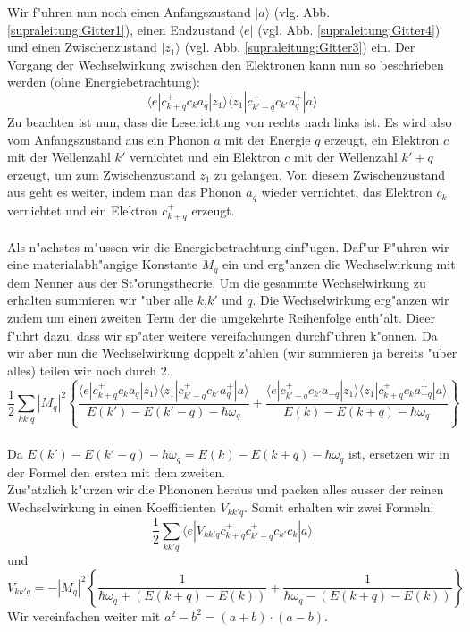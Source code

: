 \begin{refsection}
Wir f"uhren nun noch einen Anfangszustand $|a\rangle$ (vlg. Abb. \ref{supraleitung:Gitter1}), einen Endzustand $\langle e|$ (vgl. Abb. \ref{supraleitung:Gitter4}) und einen Zwischenzustand $|z_1\rangle$ (vgl. Abb. \ref{supraleitung:Gitter3}) ein. Der Vorgang der Wechselwirkung zwischen den Elektronen kann nun so beschrieben werden (ohne Energiebetrachtung):
\begin{equation}
\langle e|c^+_{k+q} c_k a_q |z_1\rangle\langle z_1| c^+_{k'-q} c_{k'} a^+_q |a\rangle
\label{supraleitung:WechelwirkungOE}
\end{equation}
Zu beachten ist nun, dass die Leserichtung von rechts nach links ist. Es wird also vom Anfangszustand aus ein Phonon $a$ mit der Energie $q$ erzeugt, ein Elektron $c$ mit der Wellenzahl $k'$ vernichtet und ein Elektron $c$ mit der Wellenzahl $k'+q$ erzeugt, um zum Zwischenzustand $z_1$ zu gelangen.
Von diesem Zwischenzustand aus geht es weiter, indem man das Phonon $a_q$ wieder vernichtet, das Elektron $c_k$ vernichtet und ein Elektron $c^+_{k+q}$ erzeugt.
\\
\\
Als n"achstes m"ussen wir die Energiebetrachtung einf"ugen. Daf"ur F"uhren wir eine materialabh"angige Konstante $M_q$ ein und erg"anzen die Wechselwirkung mit dem Nenner aus der St"orungstheorie.
Um die gesammte Wechselwirkung zu erhalten summieren wir "uber alle $k$,$k'$ und $q$. Die Wechselwirkung erg"anzen wir zudem um einen zweiten Term der die umgekehrte Reihenfolge enth"alt. Dieer f"uhrt dazu, dass wir sp"ater weitere vereifachungen durchf"uhren k"onnen. Da wir aber nun die Wechselwirkung doppelt z"ahlen (wir summieren ja bereits "uber alles) teilen wir noch durch $2$.
\\
\begin{equation}
\frac{1}{2}
\sum \limits_{kk'q} |M_q|^2
\left\{
\frac
{\langle e|c^+_{k+q} c_k a_q |z_1\rangle\langle z_1| c^+_{k'-q} c_{k'} a^+_q |a\rangle }
{E(k')-E(k'-q)-\hbar\omega_q}
+
\frac
{\langle e|c^+_{k'-q} c_{k'} a_{-q}|z_1\rangle\langle z_1| c^+_{k+q} c_k a^+_{-q} |a\rangle }
{E(k)-E(k+q)-\hbar\omega_q}
\right\}
\label{supraleitung:WechelwirkungME}
\end{equation}
\\
Da $E(k')-E(k'-q)-\hbar\omega_q = E(k)-E(k+q)-\hbar\omega_q$ ist, ersetzen wir in der Formel den ersten mit dem zweiten.
\\
Zus"atzlich k"urzen wir die Phononen heraus und packen alles ausser der reinen Wechselwirkung in einen Koeffitienten $V_{kk'q}$. Somit erhalten wir zwei Formeln:
\begin{equation}
\frac{1}{2}
\sum \limits_{kk'q} 
\langle e|V_{kk'q}c^+_{k+q}c^+_{k'-q}c_{k'}c_k|a \rangle
\label{supraleitung:WechelwirkungKurz}
\end{equation}
und
\begin{equation}
V_{kk'q} = - |M_q|^2 \left\{\frac{1}{\hbar\omega_q+(E(k+q)-E(k))}
+
\frac{1}{\hbar\omega_q-(E(k+q)-E(k))}
\right\}
\label{supraleitung:WechelwirkungVkk'q}
\end{equation}
Wir vereinfachen weiter mit $a^2-b^2 = (a+b)\cdot(a-b)$.


\end{refsection}
